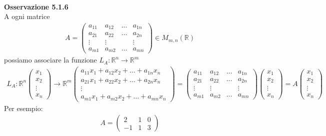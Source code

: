 \documentclass{article}
\begin{document}
\pagebreak
\textbf{\\Osservazione 5.1.6}
\\ A ogni matrice
\begin{align*}
  A=\begin{pmatrix}
    a_{11} & a_{12} & \dots & a_{1n} \\
    a_{21} & a_{22} & \dots & a_{2n} \\
    \vdots & \vdots & & \vdots \\
    a_{m1} & a_{m2} & \dots & a_{mn} 
  \end{pmatrix} \in M_{m,n}(\mathbb{R})
\end{align*}
possiamo associare la funzione $L_A : \mathbb{R}^n \to \mathbb{R}^m$
\begin{align*}
  L_A : 
  \mathbb{R}^n 
  \begin{pmatrix}
    x_1 \\
    x_2 \\
    \vdots \\
    x_n
  \end{pmatrix}
  \to 
  \mathbb{R}^m 
  \begin{pmatrix}
    a_{11}x_1 + a_{12}x_2+\dots+a_{1n}x_n \\
    a_{21}x_1 + a_{22}x_2+\dots+a_{2n}x_n \\
    \vdots \\
    a_{m1}x_1 + a_{m2}x_2+\dots+a_{mn}x_n
  \end{pmatrix}
  = \begin{pmatrix}
    a_{11} & a_{12} & \dots & a_{1n} \\
    a_{21} & a_{22} & \dots & a_{2n} \\
    \vdots & \vdots && \vdots \\
    a_{m1} & a_{m2} & \dots & a_{mn}
  \end{pmatrix}
  \begin{pmatrix}
    x_1 \\
    x_2 \\
    \vdots \\
    x_n
  \end{pmatrix}
  =
  A\begin{pmatrix}
    x_1 \\
    x_2 \\
    \vdots \\
    x_n
  \end{pmatrix}
\end{align*}
Per esempio:
\begin{align*}
  A=\begin{pmatrix}
    2 & 1 & 0 \\
    -1 & 1 & 3
  \end{pmatrix}
\end{align*}
\end{document}
